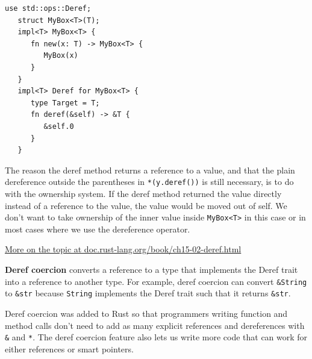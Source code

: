 
\begin{lstlisting}[caption={Implementing \texttt{Deref} Trait}, label={lst:rust_deref}]
   use std::ops::Deref;
   struct MyBox<T>(T);
   impl<T> MyBox<T> {
      fn new(x: T) -> MyBox<T> {
         MyBox(x)
      }
   }
   impl<T> Deref for MyBox<T> {
      type Target = T;
      fn deref(&self) -> &T {
         &self.0
      }
   }   
\end{lstlisting}

The reason the deref method returns a reference to a value, and that the plain dereference outside the parentheses in \lstinline|*(y.deref())| is still necessary, is to do with the ownership system. If the deref method returned the value directly instead of a reference to the value, the value would be moved out of self. We don't want to take ownership of the inner value inside \lstinline|MyBox<T>| in this case or in most cases where we use the dereference operator.

\href{https://doc.rust-lang.org/book/ch15-02-deref.html}{More on the topic at doc.rust-lang.org/book/ch15-02-deref.html}

\textbf{Deref coercion} converts a reference to a type that implements the Deref trait into a reference to another type. For example, deref coercion can convert \lstinline|&String| to \lstinline|&str| because \lstinline|String| implements the Deref trait such that it returns \lstinline|&str|.

Deref coercion was added to Rust so that programmers writing function and method calls don't need to add as many explicit references and dereferences with \lstinline|&| and \lstinline|*|. The deref coercion feature also lets us write more code that can work for either references or smart pointers.

